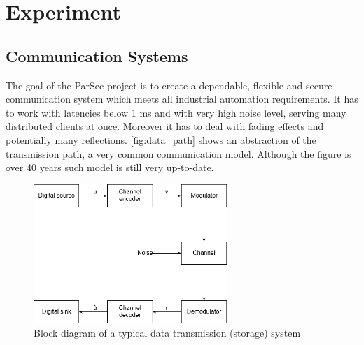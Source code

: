 \chapter{Experiment}
\section{Communication Systems}

The goal of the ParSec project is to create a dependable, flexible and secure communication system which meets all industrial automation requirements. It has to work with latencies below 1 ms and with very high noise level, serving many distributed clients at once. Moreover it has to deal with fading effects and potentially many reflections. \autoref{fig:data_path} shows an abstraction of the transmission path, a very common communication model. Although the figure is over 40 years such model is still very up-to-date.
\begin{figure}[H]
\centering
\includegraphics[width=0.65\textwidth]{figures/Data_transmission_path.png}
\caption{Block diagram of a typical data transmission (storage) system~\cite{book:LinCostello}}
\label{fig:data_path}
\end{figure}

